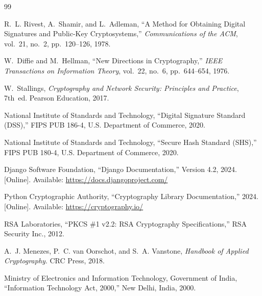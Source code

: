 \begin{thebibliography}{99}

R.~L. Rivest, A.~Shamir, and L.~Adleman, ``A Method for Obtaining Digital Signatures and Public-Key Cryptosystems,'' \textit{Communications of the ACM}, vol.~21, no.~2, pp.~120--126, 1978.

W.~Diffie and M.~Hellman, ``New Directions in Cryptography,'' \textit{IEEE Transactions on Information Theory}, vol.~22, no.~6, pp.~644--654, 1976.

W.~Stallings, \textit{Cryptography and Network Security: Principles and Practice}, 7th~ed. Pearson Education, 2017.

National Institute of Standards and Technology, ``Digital Signature Standard (DSS),'' FIPS PUB 186-4, U.S. Department of Commerce, 2020.

National Institute of Standards and Technology, ``Secure Hash Standard (SHS),'' FIPS PUB 180-4, U.S. Department of Commerce, 2020.

Django Software Foundation, ``Django Documentation,'' Version 4.2, 2024. [Online]. Available: \url{https://docs.djangoproject.com/}

Python Cryptographic Authority, ``Cryptography Library Documentation,'' 2024. [Online]. Available: \url{https://cryptography.io/}

RSA Laboratories, ``PKCS \#1 v2.2: RSA Cryptography Specifications,'' RSA Security Inc., 2012.

A.~J. Menezes, P.~C. van Oorschot, and S.~A. Vanstone, \textit{Handbook of Applied Cryptography}. CRC Press, 2018.

Ministry of Electronics and Information Technology, Government of India, ``Information Technology Act, 2000,'' New Delhi, India, 2000.

\end{thebibliography}
